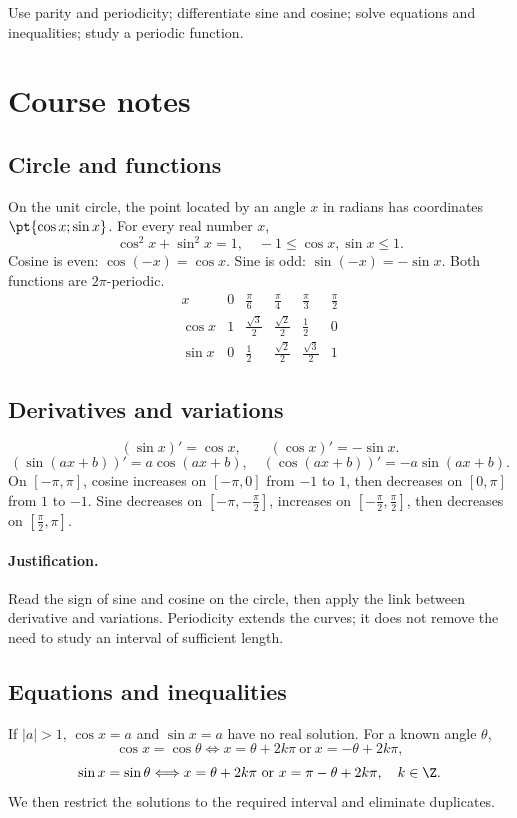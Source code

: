 \label{ch:5}


\begin{keypoint}[Objectives]Use parity and periodicity; differentiate sine and cosine; solve equations and inequalities; study a periodic function.\end{keypoint}

\section{Course notes}
\subsection{Circle and functions}
On the unit circle, the point located by an angle $x$ in radians has coordinates $\pt{\cos x;\sin x}$. For every real number $x$,
\[\cos^2x+\sin^2x=1,\quad -1\le\cos x,\sin x\le1.\]
Cosine is even: $\cos(-x)=\cos x$. Sine is odd: $\sin(-x)=-\sin x$. Both functions are $2\pi$-periodic.
\[\begin{array}{c|ccccc}x&0&\frac{\pi}{6}&\frac{\pi}{4}&\frac{\pi}{3}&\frac{\pi}{2}\\\hline
\cos x&1&\frac{\sqrt{3}}{2}&\frac{\sqrt{2}}{2}&\frac{1}{2}&0\\
\sin x&0&\frac{1}{2}&\frac{\sqrt{2}}{2}&\frac{\sqrt{3}}{2}&1
\end{array}\]
\subsection{Derivatives and variations}
\[(\sin x)'=\cos x,\qquad(\cos x)'=-\sin x.\]\[
(\sin(ax+b))'=a\cos(ax+b),\quad(\cos(ax+b))'=-a\sin(ax+b).\]
On $[-\pi,\pi]$, cosine increases on $[-\pi,0]$ from $-1$ to $1$, then decreases on $[0,\pi]$ from $1$ to $-1$. Sine decreases on $[-\pi,-\frac{\pi}{2}]$, increases on $[-\frac{\pi}{2},\frac{\pi}{2}]$, then decreases on $[\frac{\pi}{2},\pi]$.
\paragraph{Justification.} Read the sign of sine and cosine on the circle, then apply the link between derivative and variations. Periodicity extends the curves; it does not remove the need to study an interval of sufficient length.
\subsection{Equations and inequalities}
If $|a|>1$, $\cos x=a$ and $\sin x=a$ have no real solution. For a known angle $\theta$,
\[\cos x=\cos\theta\Longleftrightarrow x=\theta+2k\pi\ \text{or}\ x=-\theta+2k\pi,\]
\[\sin x=\sin\theta\Longleftrightarrow x=\theta+2k\pi\ \text{or}\ x=\pi-\theta+2k\pi,\quad k\in\Z.\]
We then restrict the solutions to the required interval and eliminate duplicates.
